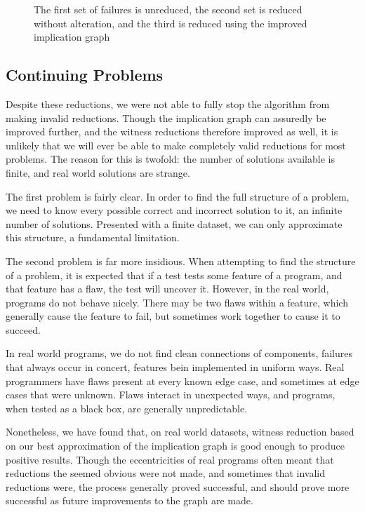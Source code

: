 \documentclass[11pt]{article}
\begin{document}
\begin{figure}



\caption{The first set of failures is unreduced, the second set is reduced without alteration, and the third is reduced using the improved implication graph}
\end{figure}

\subsection{Continuing Problems}

Despite these reductions, we were not able to fully stop the algorithm from making invalid reductions. Though the implication graph can assuredly be improved further, and the witness reductions therefore improved as well, it is unlikely that we will ever be able to make completely valid reductions for most problems. The reason for this is twofold: the number of solutions available is finite, and  real world solutions are strange.

The first problem is fairly clear. In order to find the full structure of a problem, we need to know every possible correct and incorrect solution to it, an infinite  number of solutions. Presented with a finite dataset, we can only approximate this structure, a fundamental limitation.

The second problem is far more insidious. When attempting to find the structure of a problem, it is expected that if a test tests some feature of a program, and that feature has a flaw, the test will uncover it. However, in the real world, programs do not behave nicely. There may be two flaws within a feature, which generally cause the feature to fail, but sometimes work together to cause it to succeed.

In real world programs, we do not find clean connections of components, failures that always occur in concert, features bein implemented in uniform ways. Real programmers have flaws present at every known edge case, and sometimes at edge cases that were unknown. Flaws interact in unexpected ways, and programs, when tested as a black box, are generally unpredictable.

Nonetheless, we have found that, on real world datasets, witness reduction based on our best approximation of the implication graph is good enough to produce positive results. Though the eccentricities of real programs often meant that reductions the seemed obvious were not made, and sometimes that invalid reductions were, the process generally proved successful, and should prove more successful as future improvements to the graph are made.
\end{document}
